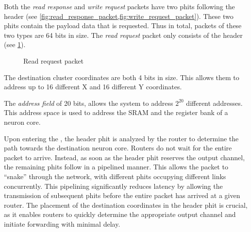Both the \textit{read response} and \textit{write request} packets have two phits following the header (see \cref{fig:read_response_packet,fig:write_request_packet}).
These two phits contain the payload data that is requested.
Thus in total, packets of these two types are 64 bits in size.
The \textit{read request} packet only consists of the header (see \cref{fig:read_request_packet}).

\hspace*{0.5em}
\begin{figure}[hbtp]
    \centering
    \begin{adjustbox}{width=0.7\linewidth}
        
    \end{adjustbox}
    \caption{Read request packet}
    \label{fig:read_request_packet}
\end{figure}

The destination cluster coordinates are both 4 bits in size.
This allows them to address up to 16 different X and 16 different Y coordinates.

The \textit{address field} of 20 bits, allows the system to address $2^{20}$ different addresses.
This address space is used to address the SRAM and the register bank of a neuron core.

Upon entering the \confignoc{}, the header phit is analyzed by the router to determine the path towards the destination neuron core.
Routers do not wait for the entire packet to arrive.
Instead, as soon as the header phit reserves the output channel, the remaining phits follow in a pipelined manner.
This allows the packet to ``snake'' through the network, with different phits occupying different links concurrently.
This pipelining significantly reduces latency by allowing the transmission of subsequent phits before the entire packet has arrived at a given router.
The placement of the destination coordinates in the header phit is crucial, as it enables routers to quickly determine the appropriate output channel and initiate forwarding with minimal delay.


